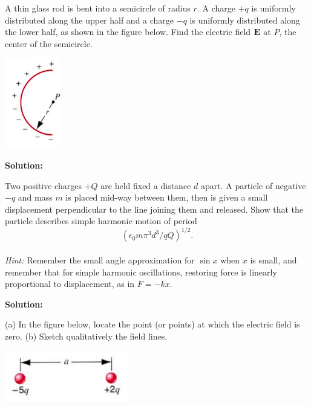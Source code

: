 \documentclass[11pt]{article}
\newcommand{\pn}[1]{\left( #1 \right)}
\begin{document}
\clearpage

\begin{problem}[E26.16]
A thin glass rod is bent into a semicircle of radius $r$. A charge $+q$ is uniformly distributed along the upper half and a charge $-q$ is uniformly
distributed along the lower half, as shown in the figure below. Find the electric field $\mathbf{E}$ at $P$, the center of the semicircle.
\begin{center}
\includegraphics[scale=0.75]{prob3.png}
\end{center}
\end{problem}


\textbf{Solution:}


\clearpage

\begin{problem}[P25.8]
Two positive charges $+Q$ are held fixed a distance $d$ apart. A particle of negative $-q$ and mass $m$ is placed mid-way between them, 
then is given a small displacement perpendicular to the line joining them and released. Show that the particle describes simple harmonic motion of period
$$\pn{\epsilon_0m\pi^3d^3/qQ}^{1/2}.$$\\
\textit{Hint:} Remember the small angle approximation for $\sin x$ when $x$ is small, and remember that for simple harmonic oscillations, restoring force is linearly
proportional to displacement, as in $F = -kx$.
\end{problem}


\textbf{Solution:}


\clearpage

\begin{problem}[E26.24]
(a) In the figure below, locate the point (or points) at which the electric field is zero. (b) Sketch qualitatively the field lines.
\begin{center}
\includegraphics[scale=0.8]{prob5.png}
\end{center}
\end{problem}
\end{document}
